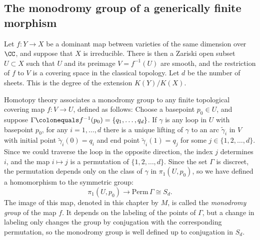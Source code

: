\subsection*{The monodromy group of a generically finite morphism}

Let $f : Y \to X$ be a
dominant map between varieties of the same dimension
%
over $\CC$, and suppose that $X$ is irreducible. There is then
a Zariski open subset $U \subset X$ such that $U$ and
its preimage $V = f^{-1}(U)$ are smooth, and the restriction of $f$
to $V$ is a covering space in the classical topology. Let $d$ be the
%
number of sheets. This is the degree of the extension $K(Y)/K(X)$.

Homotopy theory
%
associates a monodromy group to any finite
topological covering map $f : V \to U$, defined as follows: Choose a
basepoint $p_0 \in U$, and suppose $\Gamma \colonequals  f^{-1}(p_0)  =
\{q_1,\dots,q_d\}$. If $\gamma$ is any loop in $U$ with basepoint $p_0$,
for any $i = 1, \dots, d$ there is a unique lifting of $\gamma$ to an
arc $\tilde \gamma_i$ in $V$ with initial point $\tilde \gamma_i(0)
= q_i$ and end point $\tilde \gamma_i(1) = q_j$ for some $j \in
\{1,2,\dots,d\}$. Since we could traverse the loop in the opposite
direction, the index $j$ determines $i$, and the map $i\mapsto j$ is a
permutation of $\{1,2,\dots,d\}$.
Since the set $\Gamma$ is discreet, the permutation depends only on the
class of $\gamma$ in $\pi_1(U,p_0)$, so we have defined a homomorphism
to the
symmetric group:
%
$$
\pi_1(U,p_0)  \to \mathrm{ Perm}\,\Gamma \cong S_d.
$$
The image of this map,
 denoted in this chapter by $M$,
is called the \emph{monodromy group} of the
%
map $f$. It depends on the labeling of the points of $\Gamma$, but a
change in labeling
only changes the group by conjugation with the corresponding permutation,
so the monodromy group is well defined up to
conjugation in $S_{d}$.
\vspace*{3pt}


